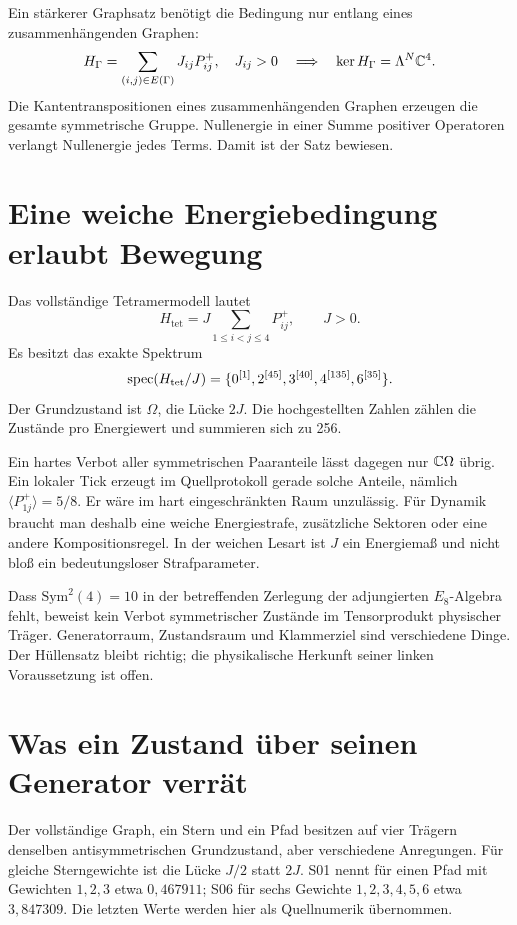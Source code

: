 Ein stärkerer Graphsatz benötigt die Bedingung nur entlang eines zusammenhängenden Graphen:
\begin{equation}
H_\Gamma=\sum_{(i,j)\in E(\Gamma)}J_{ij}P^+_{ij},\quad J_{ij}>0
\quad\Longrightarrow\quad\ker H_\Gamma=\Lambda^N\mathbb C^4.
\end{equation}
Die Kantentranspositionen eines zusammenhängenden Graphen erzeugen die gesamte symmetrische Gruppe. Nullenergie in einer Summe positiver Operatoren verlangt Nullenergie jedes Terms. Damit ist der Satz bewiesen.

\section{Eine weiche Energiebedingung erlaubt Bewegung}
Das vollständige Tetramermodell lautet
\begin{equation}
H_{\mathrm{tet}}=J\sum_{1\le i<j\le4}P^+_{ij},\qquad J>0.
\end{equation}
Es besitzt das exakte Spektrum
\begin{equation}
\operatorname{spec}(H_{\mathrm{tet}}/J)=\{0^{[1]},2^{[45]},3^{[40]},4^{[135]},6^{[35]}\}.
\label{eq:tet-spec}
\end{equation}
Der Grundzustand ist $\Omega$, die Lücke $2J$. Die hochgestellten Zahlen zählen die Zustände pro Energiewert und summieren sich zu 256.

Ein hartes Verbot aller symmetrischen Paaranteile lässt dagegen nur $\mathbb C\Omega$ übrig. Ein lokaler Tick erzeugt im Quellprotokoll gerade solche Anteile, nämlich $\langle P^+_{1j}\rangle=5/8$. Er wäre im hart eingeschränkten Raum unzulässig. Für Dynamik braucht man deshalb eine weiche Energiestrafe, zusätzliche Sektoren oder eine andere Kompositionsregel. In der weichen Lesart ist $J$ ein Energiemaß und nicht bloß ein bedeutungsloser Strafparameter.

Dass $\mathrm{Sym}^2(4)=10$ in der betreffenden Zerlegung der adjungierten $E_8$-Algebra fehlt, beweist kein Verbot symmetrischer Zustände im Tensorprodukt physischer Träger. Generatorraum, Zustandsraum und Klammerziel sind verschiedene Dinge. Der Hüllensatz bleibt richtig; die physikalische Herkunft seiner linken Voraussetzung ist offen.

\section{Was ein Zustand über seinen Generator verrät}
Der vollständige Graph, ein Stern und ein Pfad besitzen auf vier Trägern denselben antisymmetrischen Grundzustand, aber verschiedene Anregungen. Für gleiche Sterngewichte ist die Lücke $J/2$ statt $2J$. S01 nennt für einen Pfad mit Gewichten $1,2,3$ etwa $0{,}467911$; S06 für sechs Gewichte $1,2,3,4,5,6$ etwa $3{,}847309$. Die letzten Werte werden hier als Quellnumerik übernommen.

